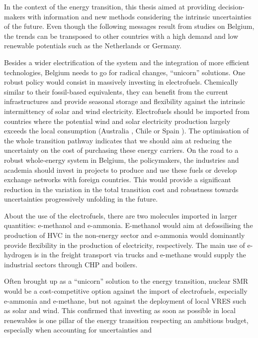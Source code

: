 In the context of the energy transition, this thesis aimed at providing decision-makers with information and new methods considering the intrinsic uncertainties of the future. Even though the following messages result from studies on Belgium, the trends can be transposed to other countries with a high demand and low renewable potentials such as the Netherlands or Germany. 

Besides a wider electrification of the system and the integration of more efficient technologies, Belgium needs to go for radical changes, ``unicorn'' solutions. One robust policy would consist in massively investing in electrofuels. Chemically similar to their fossil-based equivalents, they can benefit from the current infrastructures and provide seasonal storage and flexibility against the intrinsic intermittency of solar and wind electricity. Electrofuels should be imported from countries where the potential wind and solar electricity production largely exceeds the local consumption (Australia \cite{Australia_efuels}, Chile \cite{Chile_efuels} or Spain \cite{Spain_efuels}). The optimisation of the whole transition pathway indicates that we should aim at reducing the uncertainty on the cost of purchasing these energy carriers. On the road to a robust whole-energy system in Belgium, the policymakers, the industries and academia should invest in projects to produce and use these fuels or develop exchange networks with foreign countries. This would provide a significant reduction in the variation in the total transition cost and robustness towards uncertainties progressively unfolding in the future. 

About the use of the electrofuels, there are two molecules imported in larger quantities: e-methanol and e-ammonia. E-methanol would aim at defossilising the production of \acrfull{HVC} in the non-energy sector and e-ammonia would dominantly provide flexibility in the production of electricity, respectively. The main use of e-hydrogen is in the freight transport via trucks and e-methane would supply the industrial sectors through \gls{CHP} and boilers.

Often brought up as a ``unicorn'' solution to the energy transition, nuclear \gls{SMR} would be a cost-competitive option against the import of electrofuels, especially e-ammonia and e-methane, but not against the deployment of local \acrfull{VRES} such as solar and wind. This confirmed that investing as soon as possible in local renewables is one pillar of the energy transition respecting an ambitious  budget, especially when accounting for uncertainties and  

